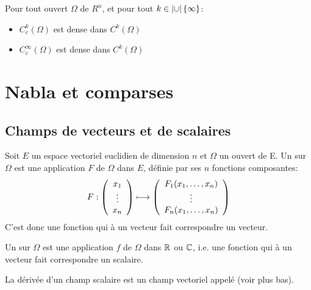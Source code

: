 \ifVersionDuDocEstVincent\medskip\fi
\ifVersionDuDocEstVincent\medskip\fi
Pour tout ouvert $\Omega$ de $R^n$, et pour tout $k\in\left| \cup\right|\{\infty\}$:
\begin{itemize}
   \item $C_c^k(\Omega)$ est dense dans $C^k(\Omega)$
   \item $C_c^\infty(\Omega)$ est dense dans $C^k(\Omega)$
\end{itemize}

\ifVersionDuDocEstVincent\medskip\fi
\section{Nabla et comparses}
\subsection{Champs de vecteurs et de scalaires}
\begin{definition}
Soit $E$ un espace vectoriel euclidien
de dimension $n$ et $\Omega$ un ouvert de E.
Un  sur $\Omega$ est une application $F$ de $\Omega$ dans $E$,
définie par ses $n$ fonctions composantes:
\begin{equation}
    F : \left( \begin{array}{c}x_1\\\vdots\\x_n\end{array}\right) \longmapsto \left( \begin{array}{c} F_1(x_1,\dots,x_n)\\ \vdots\\ F_n(x_1,\dots,x_n)\end{array}\right)
\end{equation}
C'est donc une fonction qui à un vecteur fait correspondre un vecteur.
\end{definition}
\ifVersionDuDocEstVincent\medskip\fi
\begin{definition}
Un  sur $\Omega$ est une application $f$ de $\Omega$ dans $\mathbb R$ ou $\mathbb C$,
i.e. une fonction qui à un vecteur fait correspondre un scalaire.
\end{definition}
La dérivée d'un champ scalaire est un champ vectoriel appelé  (voir plus bas).

